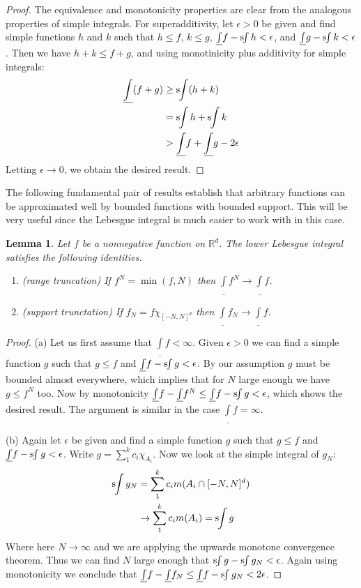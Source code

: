 \documentclass[11pt,oneside]{amsbook}
\newcommand{\RR}{{\mathbb R}}
\newcommand{\sint}{\text{s}\kern-3pt\int}
\newcommand{\lint}{\underline\int}
\theoremstyle{definition}
\theoremstyle{plain}
\newtheorem{lem}[thm]{Lemma}
\theoremstyle{definition}
\theoremstyle{remark}
\numberwithin{equation}{section}
\numberwithin{figure}{section}
\begin{document}
\begin{proof}
  The equivalence and monotonicity properties are clear from the analogous properties of simple integrals. For superadditivity, let $\epsilon>0$ be given and find simple functions $h$ and $k$ such that $h\leq f$, $k\leq g$, $\lint f-\sint h<\epsilon$, and $\lint g-\sint k<\epsilon$. Then we have $h+k\leq f+g$, and using monotinicity plus additivity for simple integrals:
  \begin{align*}
    \lint(f+g)&\geq\sint(h+k)\\
              &=\sint h+\sint k\\
              &>\lint f+\lint g-2\epsilon
  \end{align*}
  Letting $\epsilon\to0$, we obtain the desired result.
\end{proof}

The following fundamental pair of results establish that arbitrary functions can be approximated well by bounded functions with bounded support. This will be very useful since the Lebesgue integral is much easier to work with in this case.


\begin{lem}
  Let $f$ be a nonnegative function on $\RR^d$. The lower Lebesgue integral satisfies the following identities.
  \begin{enumerate}
  \item (range truncation) If $f^N=\min(f,N)$ then $\lint f^N\to\lint f$.
  \item (support trunctation) If $f_N=f\chi_{[-N,N]^d}$ then $\lint f_N\to\lint f$.
  \end{enumerate}
\end{lem}

\begin{proof}
  (a) Let us first assume that $\lint f<\infty$. Given $\epsilon>0$ we can find a simple function $g$ such that $g\leq f$ and $\lint f-\sint g<\epsilon$. By our assumption $g$ must be bounded almost everywhere, which implies that for $N$ large enough we have $g\leq f^N$ too. Now by monotonicity $\lint f-\lint f^N\leq \lint f-\sint g<\epsilon$, which shows the desired result. The argument is similar in the case $\lint f=\infty$.

  (b) Again let $\epsilon$ be given and find a simple function $g$ such that $g\leq f$ and $\lint f-\sint g<\epsilon$. Write $g=\sum_1^kc_i\chi_{A_i}$. Now we look at the simple integral of $g_N$:
  \begin{align*}
    \sint g_N&=\sum_1^kc_im(A_i\cap[-N,N]^d)\\
                    &\to\sum_1^kc_im(A_i)=\sint g
  \end{align*}
  Where here $N\to\infty$ and we are applying the upwards monotone convergence theorem. Thus we can find $N$ large enough that $\sint g-\sint g_N<\epsilon$. Again using monotonicity we conclude that $\lint f-\lint f_N\leq\lint f-\sint g_N<2\epsilon$.
\end{proof}
\end{document}

